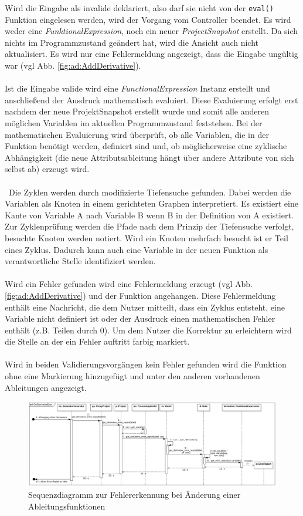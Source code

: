 \documentclass{article}
\begin{document}
Wird die Eingabe als invalide deklariert, also darf sie nicht von der \texttt{eval()} Funktion eingelesen werden, wird der Vorgang vom Controller beendet. Es wird weder eine \textit{FunktionalExpression}, noch ein neuer \textit{ProjectSnapshot} erstellt. Da sich nichts im Programmzustand geändert hat, wird die Ansicht auch nicht aktualisiert. Es wird nur eine Fehlermeldung angezeigt, dass die Eingabe ungültig war (vgl Abb. \ref{fig:ad:AddDerivative}).
\\\\
Ist die Eingabe valide wird eine \textit{FunctionalExpression} Instanz erstellt und anschließend der Ausdruck mathematisch evaluiert. Diese Evaluierung erfolgt erst nachdem der neue ProjektSnapshot erstellt wurde und somit alle anderen möglichen Variablen im aktuellen Programmzustand feststehen. Bei der mathematischen Evaluierung wird überprüft, ob alle Variablen, die in der Funktion benötigt werden, definiert sind und, ob möglicherweise eine zyklische Abhängigkeit (die neue Attributsableitung hängt über andere Attribute von sich selbst ab) erzeugt wird. 
\\\\\ Die Zyklen werden durch modifizierte Tiefensuche gefunden. Dabei werden die Variablen als Knoten in einem gerichteten Graphen interpretiert. Es existiert eine Kante von Variable A nach Variable B wenn B in der Definition von A existiert. Zur Zyklenprüfung werden die Pfade nach dem Prinzip der Tiefensuche verfolgt, besuchte Knoten werden notiert. Wird ein Knoten mehrfach besucht ist er Teil eines Zyklus. Dadurch kann auch eine Variable in der neuen Funktion als verantwortliche Stelle identifiziert werden.
\\\\ Wird ein Fehler gefunden wird eine Fehlermeldung erzeugt (vgl Abb. \ref{fig:ad:AddDerivative}) und der Funktion angehangen. Diese Fehlermeldung enthält eine Nachricht, die dem Nutzer mitteilt, dass ein Zyklus entsteht, eine Variable nicht definiert ist oder der Ausdruck einen mathematischen Fehler enthält (z.B. Teilen durch 0). Um dem Nutzer die Korrektur zu erleichtern wird die Stelle an der ein Fehler auftritt farbig markiert.\\\\
Wird in beiden Validierungsvorgängen kein Fehler gefunden wird die Funktion ohne eine Markierung hinzugefügt und unter den anderen vorhandenen Ableitungen angezeigt.
\\
\begin{figure}[H]%
    \centering
    \includegraphics[width=12cm]{entwurf/Floriane/GetDerivativeError.png}
    \caption{Sequenzdiagramm zur Fehlererkennung bei Änderung einer Ableitungsfunktionen}
    \label{fig:sq:GetDerivativeError}
\end{figure}
\end{document}
